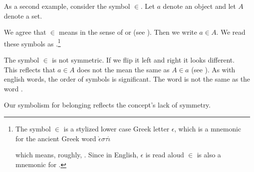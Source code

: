 As a second example, consider the symbol $\in$.
Let $a$ denote an object and let $A$ denote a set.
%  

We agree that $\in$ means  in the sense of  or  (see ).
Then we write $a \in A$.
We read these symbols as .\footnote{The symbol $\in$ is a stylized lower case Greek letter $\epsilon $, which is a mnemonic for the ancient Greek word $\grave{\epsilon} \sigma \tau \acute{\iota}$

which means, roughly, .
Since in English, $\epsilon $ is read aloud  $\in$ is also a mnemonic for .}

The symbol $\in$ is not symmetric.
If we flip it left and right it looks different.
This reflects that $a \in A$ does not the mean the same as $A \in a$ (see ).
As with english words, the order of symbols is significant.
The word  is not the same as the word .
%  

Our symbolism for belonging reflects the concept's lack of symmetry.

